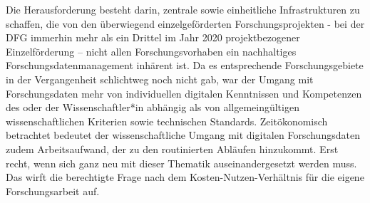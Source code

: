 Die Herausforderung besteht darin, zentrale sowie einheitliche Infrastrukturen zu schaffen, die von den überwiegend einzelgeförderten Forschungsprojekten - bei der DFG immerhin mehr als ein Drittel im Jahr 2020 projektbezogener Einzelförderung – nicht allen Forschungsvorhaben ein nachhaltiges Forschungsdatenmanagement inhärent ist. Da es entsprechende Forschungsgebiete in der Vergangenheit schlichtweg noch nicht gab, war der Umgang mit Forschungsdaten mehr von individuellen digitalen Kenntnissen und Kompetenzen des oder der Wissenschaftler*in abhängig als von allgemeingültigen wissenschaftlichen Kriterien sowie technischen Standards. Zeitökonomisch betrachtet bedeutet der wissenschaftliche Umgang mit digitalen Forschungsdaten zudem Arbeitsaufwand, der zu den routinierten Abläufen hinzukommt. Erst recht, wenn sich ganz neu mit dieser Thematik auseinandergesetzt werden muss. Das wirft die berechtigte Frage nach dem Kosten-Nutzen-Verhältnis für die eigene Forschungsarbeit auf.